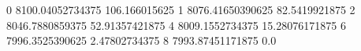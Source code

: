 0 8100.04052734375 106.166015625
1 8076.41650390625 82.5419921875
2 8046.7880859375 52.91357421875
4 8009.1552734375 15.28076171875
6 7996.3525390625 2.47802734375
8 7993.87451171875 0.0
